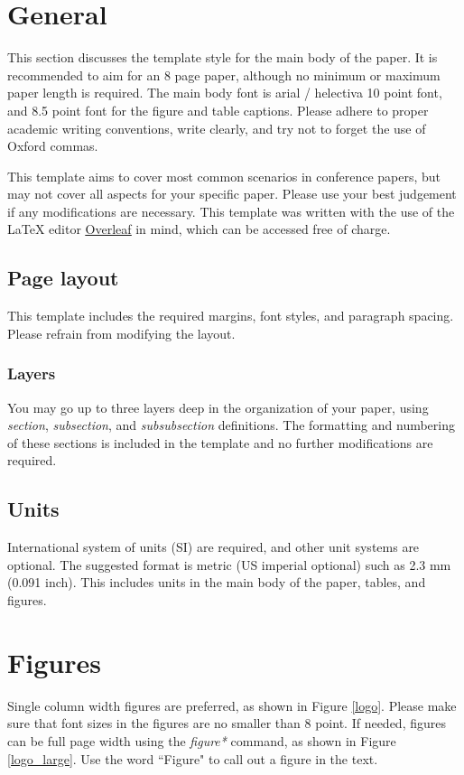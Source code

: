 \documentclass[letter,10pt,twocolumn]{article}
\begin{document}
\setcounter{secnumdepth}{3} %

\section{General}
This section discusses the template style for the main body of the paper. It is recommended to aim for an 8 page paper, although no minimum or maximum paper length is required. The main body font is arial / helectiva 10 point font, and 8.5 point font for the figure and table captions. Please adhere to proper academic writing conventions, write clearly, and try not to forget the use of Oxford commas.

This template aims to cover most common scenarios in conference papers, but may not cover all aspects for your specific paper. Please use your best judgement if any modifications are necessary. This template was written with the use of the LaTeX editor \href{https://www.overleaf.com}{\underline{Overleaf}} in mind, which can be accessed free of charge.

\subsection{Page layout}
This template includes the required margins, font styles, and paragraph spacing. Please refrain from modifying the layout.

\subsubsection{Layers}
You may go up to three layers deep in the organization of your paper, using \textit{section}, \textit{subsection}, and \textit{subsubsection} definitions. The formatting and numbering of these sections is included in the template and no further modifications are required.

\subsection{Units}
International system of units (SI) are required, and other unit systems are optional. The suggested format is metric (US imperial optional) such as 2.3 mm (0.091 inch). This includes units in the main body of the paper, tables, and figures.

\section{Figures}
Single column width figures are preferred, as shown in Figure \ref{logo}. Please make sure that font sizes in the figures are no smaller than 8 point. If needed, figures can be full page width using the \textit{figure*} command, as shown in Figure \ref{logo_large}. Use the word ``Figure" to call out a figure in the text.
\end{document}
